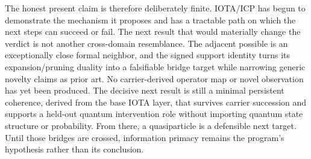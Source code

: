 The honest present claim is therefore deliberately finite. IOTA/ICP has begun
to demonstrate the mechanism it proposes and has a tractable path on which the
next steps can succeed or fail. The next result that would materially change
the verdict is not another cross-domain resemblance. The adjacent possible is
an exceptionally close formal neighbor, and the signed support identity turns
its expansion/pruning duality into a falsifiable bridge target while narrowing
generic novelty claims as prior art. No carrier-derived operator map or novel
observation has yet been produced. The decisive next result is still a minimal
persistent
coherence, derived from the base IOTA layer, that survives carrier succession
and supports a held-out quantum intervention role without importing quantum
state structure or probability. From there, a quasiparticle is a defensible
next target. Until those bridges are crossed, information primacy remains the
program's hypothesis rather than its conclusion.
